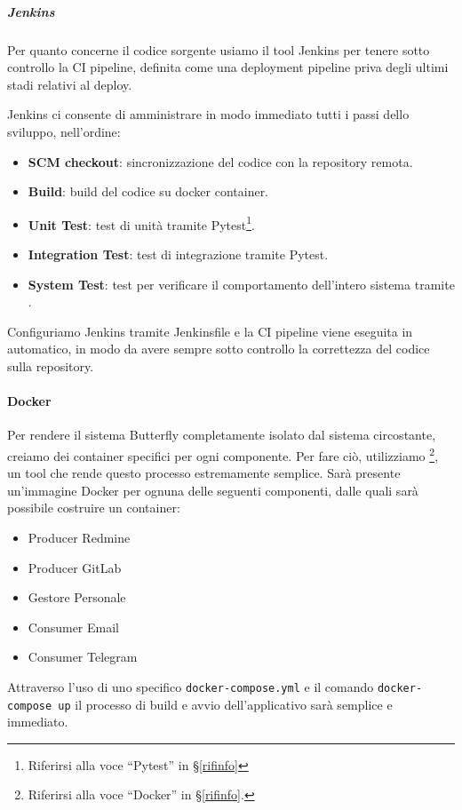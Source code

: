 			\subparagraph{Jenkins}\label{Jenkins}
			Per quanto concerne il codice sorgente usiamo il tool Jenkins per tenere sotto controllo la CI pipeline, definita come una deployment pipeline priva degli ultimi stadi relativi al deploy.\par
			Jenkins ci consente di amministrare in modo immediato tutti i passi dello sviluppo, nell'ordine:
			\begin{itemize}
				\item \textbf{SCM checkout}: sincronizzazione del codice con la repository remota.
				\item \textbf{Build}: build del codice su docker container.
				\item \textbf{Unit Test}: test di unità tramite Pytest\footnote{Riferirsi alla voce ``Pytest'' in \S\ref{rifinfo}}.
				\item \textbf{Integration Test}: test di integrazione tramite Pytest.
				\item \textbf{System Test}: test per verificare il comportamento dell'intero sistema tramite .
			\end{itemize}

			Configuriamo Jenkins tramite Jenkinsfile e la CI pipeline viene eseguita in automatico, in modo da avere sempre sotto controllo la correttezza del codice sulla repository.

		\paragraph{Docker}\label{Docker} %
		Per rendere il sistema Butterfly completamente isolato dal sistema circostante, creiamo dei container specifici per ogni componente. Per fare ciò, utilizziamo
		\footnote{Riferirsi alla voce ``Docker'' in \S\ref{rifinfo}.},
		un tool che rende questo processo estremamente semplice. Sarà presente un'immagine Docker per ognuna delle seguenti componenti, dalle quali sarà possibile costruire un container:
		\begin{itemize}
			\item Producer Redmine
			\item Producer GitLab
			\item Gestore Personale
			\item Consumer Email
			\item Consumer Telegram
		\end{itemize}
		Attraverso l'uso di uno specifico \texttt{docker-compose.yml} e il comando \texttt{docker-compose up} il processo di build e avvio dell'applicativo sarà semplice e immediato.

